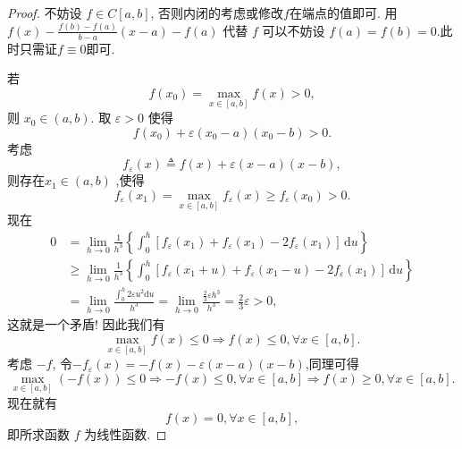 \documentclass[../../main.tex]{subfiles}
\begin{document}
\begin{proof}
不妨设 $f \in C[a,b]$, 否则内闭的考虑或修改$f$在端点的值即可. 用 $f(x) - \frac{f(b) - f(a)}{b - a}(x - a) - f(a)$ 代替 $f$ 可以不妨设 $f(a) = f(b) = 0$.此时只需证$f\equiv 0$即可.

若
\[
f(x_0) = \max_{x \in [a,b]} f(x) > 0,
\]
则 $x_0 \in (a,b)$. 取 $\varepsilon > 0$ 使得
\[
f(x_0) + \varepsilon (x_0 - a)(x_0 - b) > 0.
\]
考虑
\[
f_\varepsilon(x) \triangleq f(x) + \varepsilon (x - a)(x - b),
\]
则存在$x_1 \in (a,b)$ ,使得
\[
f_\varepsilon(x_1) = \max_{x \in [a,b]} f_\varepsilon(x) \geqslant f_{\varepsilon}(x_0)> 0.
\]
现在
\begin{align*}
0&=\lim_{h\rightarrow 0} \frac{1}{h^3}\left\{ \int_0^h{[f_{\varepsilon}(x_1)+f_{\varepsilon}(x_1)-2f_{\varepsilon}(x_1)]\,\mathrm{d}u} \right\} 
\\
&\geqslant \lim_{h\rightarrow 0} \frac{1}{h^3}\left\{ \int_0^h{[f_{\varepsilon}(x_1+u)+f_{\varepsilon}(x_1-u)-2f_{\varepsilon}(x_1)]\,\mathrm{d}u} \right\} 
\\
&=\lim_{h\rightarrow 0} \frac{\int_0^h{2\varepsilon u^2\mathrm{d}u}}{h^3}=\lim_{h\rightarrow 0} \frac{\frac{2}{3}\varepsilon h^3}{h^3}=\frac{2}{3}\varepsilon >0,
\end{align*}
这就是一个矛盾! 因此我们有
\[
\max_{x\in [a,b]} f(x)\leqslant 0\Longrightarrow f\left( x \right) \leqslant 0,\forall x\in \left[ a,b \right] .
\]
考虑 $-f$, 令$-f_{\varepsilon}\left( x \right) =-f\left( x \right) -\varepsilon \left( x-a \right) \left( x-b \right) $,同理可得
\[
\max_{x\in [a,b]} (-f(x))\leqslant 0\Longrightarrow -f\left( x \right) \leqslant 0,\forall x\in \left[ a,b \right] \Longrightarrow f\left( x \right) \geqslant 0,\forall x\in \left[ a,b \right] .
\]
现在就有
\[
f(x) = 0, \forall x \in [a,b],
\]
即所求函数 $f$ 为线性函数.

\end{proof}
\end{document}
